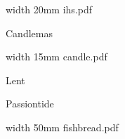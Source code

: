 \pdfximage width 20mm {ihs.pdf}

\centerline{\pdfrefximage \pdflastximage}



\eject


\bigskip

\bigskip



\eject

\beginpart Candlemas


\bigskip

\pdfximage width 15mm {candle.pdf}

\centerline{\pdfrefximage \pdflastximage}




\bigskip

\eject

\beginpart Lent


\paginaproxima


\paginaproxima

\beginpart Passiontide


\bigskip

\paginaproxima


\bigskip



\eject


\bigskip

\pdfximage width 50mm {fishbread.pdf}

\centerline{\pdfrefximage \pdflastximage}



\bigskip

\eject


